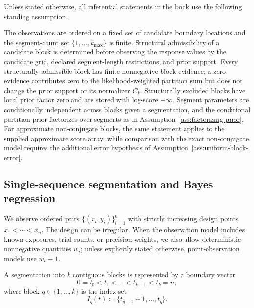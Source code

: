 Unless stated otherwise, all inferential statements in the book use the following standing assumption.

\begin{assumption}
\label{ass:standing-offline}
The observations are ordered on a fixed set of candidate boundary locations and the segment-count
set $\{1,\dots,k_{\max}\}$ is finite. Structural admissibility of a candidate block is determined
before observing the response values by the candidate grid, declared segment-length restrictions,
and prior support. Every structurally admissible block has finite nonnegative block evidence; a zero
evidence contributes zero to the likelihood-weighted partition sum but does not change the prior
support or its normalizer $C_k$. Structurally excluded blocks have local prior factor zero and are
stored with log-score $-\infty$. Segment parameters are conditionally independent across blocks
given a segmentation, and the conditional partition prior factorizes over segments as in
Assumption~\ref{ass:factorizing-prior}. For approximate non-conjugate blocks, the same statement
applies to the supplied approximate score array, while comparison with the exact non-conjugate model
requires the additional error hypothesis of Assumption~\ref{ass:uniform-block-error}.
\end{assumption}

\subsection{Single-sequence segmentation and Bayes regression}
\label{sec:problem-single}

We observe ordered pairs $\{(x_i,y_i)\}_{i=1}^n$ with strictly increasing design points
$x_1<\cdots<x_n$. The design can be irregular. When the observation model includes known
exposures, trial counts, or precision weights, we also allow deterministic nonnegative quantities
$w_i$; unless explicitly stated otherwise, point-observation models use $w_i\equiv 1$.

A segmentation into $k$ contiguous blocks is represented by a boundary vector
\begin{equation}
0=t_0<t_1<\cdots<t_{k-1}<t_k=n,
\end{equation}
where block $q\in\{1,\dots,k\}$ is the index set
\begin{equation}
I_q(t)\coloneqq \{t_{q-1}+1,\dots,t_q\}.
\end{equation}

